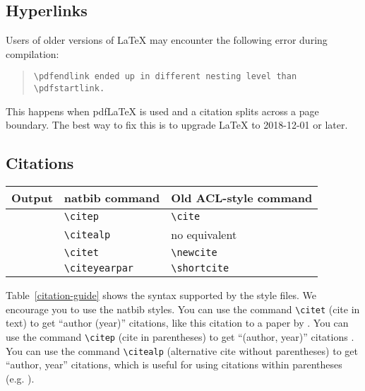 \documentclass[11pt]{article}
\begin{document}
\subsection{Hyperlinks}

Users of older versions of \LaTeX{} may encounter the following error during compilation: 
\begin{quote}
\tt\verb|\pdfendlink| ended up in different nesting level than \verb|\pdfstartlink|.
\end{quote}
This happens when pdf\LaTeX{} is used and a citation splits across a page boundary. The best way to fix this is to upgrade \LaTeX{} to 2018-12-01 or later.

\subsection{Citations}

\begin{table*}
\centering
\begin{tabular}{lll}
\hline
\textbf{Output} & \textbf{natbib command} & \textbf{Old ACL-style command}\\
\hline
\citep{Gusfield:97} & \verb|\citep| & \verb|\cite| \\
\citealp{Gusfield:97} & \verb|\citealp| & no equivalent \\
\citet{Gusfield:97} & \verb|\citet| & \verb|\newcite| \\
\citeyearpar{Gusfield:97} & \verb|\citeyearpar| & \verb|\shortcite| \\
\hline
\end{tabular}
\caption{\label{citation-guide}
Citation commands supported by the style file.
The style is based on the natbib package and supports all natbib citation commands.
It also supports commands defined in previous ACL style files for compatibility.
}
\end{table*}

Table~\ref{citation-guide} shows the syntax supported by the style files.
We encourage you to use the natbib styles.
You can use the command \verb|\citet| (cite in text) to get ``author (year)'' citations, like this citation to a paper by \citet{Gusfield:97}.
You can use the command \verb|\citep| (cite in parentheses) to get ``(author, year)'' citations \citep{Gusfield:97}.
You can use the command \verb|\citealp| (alternative cite without parentheses) to get ``author, year'' citations, which is useful for using citations within parentheses (e.g. \citealp{Gusfield:97}).
\end{document}
